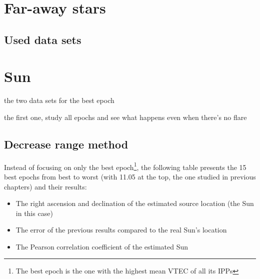 \clearpage
\clearpage
\clearpage
\clearpage









\section{Far-away stars}

\subsection{Used data sets}










\section{Sun}

the two data sets for the best epoch

the first one, study all epochs and see what happens even when there's no flare

\subsection{Decrease range method}

Instead of focusing on only the best epoch\footnote{The best epoch is the one with the highest mean VTEC of all its IPPs}, the following table presents the 15 best epochs from best to worst (with 11.05 at the top, the one studied in previous chapters) and their results: 

\begin{itemize}
	\item The right ascension and declination of the estimated source location (the Sun in this case)
	\item The error of the previous results compared to the real Sun's location
	\item The Pearson correlation coefficient of the estimated Sun
\end{itemize}

